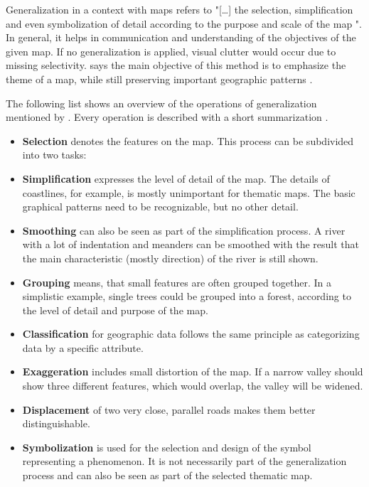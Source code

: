 Generalization in a context with maps refers to "[\ldots] the selection, simplification and even symbolization of detail according to the purpose and scale of the map ".
In general, it helps in communication and understanding of the objectives of the given map. If no generalization is applied, visual clutter would occur due to missing selectivity. \citeauthor{Tyner2010} says the main objective of this method is to emphasize the theme of a map, while still preserving important geographic patterns .

The following list shows an overview of the operations of generalization mentioned by \citeauthor{Tyner2010}. Every operation is described with a short summarization .

\begin{itemize}
\item \textbf{Selection} denotes the features on the map. This process can be subdivided into two tasks:


\item \textbf{Simplification} expresses the level of detail of the map. The details of coastlines, for example, is mostly unimportant for thematic maps. The basic graphical patterns need to be recognizable, but no other detail.

\item \textbf{Smoothing} can also be seen as part of the simplification process. A river with a lot of indentation and meanders can be smoothed with the result that the main characteristic (mostly direction) of the river is still shown.

\item \textbf{Grouping} means, that small features are often grouped together. In a simplistic example, single trees could be grouped into a forest, according to the level of detail and purpose of the map.

\item \textbf{Classification} for geographic data follows the same principle as categorizing data by a specific attribute.

\item \textbf{Exaggeration} includes small distortion of the map. If a narrow valley should show three different features, which would overlap, the valley will be widened.

\item \textbf{Displacement} of two very close, parallel roads makes them better distinguishable.

\item \textbf{Symbolization} is used for the selection and design of the symbol representing a phenomenon. It is not necessarily part of the generalization process and can also be seen as part of the selected thematic map.

\end{itemize}